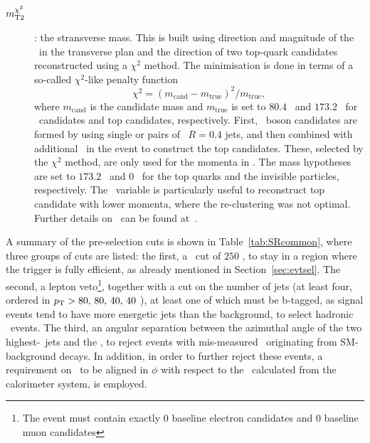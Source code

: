 \begin{description}
				\item[\boldmath $m_{\mathrm{T2}}^{\chi^2}$]: the stransverse mass. This is built using direction and magnitude of the \ptmiss\ in the transverse plan and the direction of two top-quark candidates reconstructed using a $\chi^2$ method. The minimisation is done in terms of a so-called $\chi^2$-like penalty function $$\chi^2 = \left(m_{\mathrm{cand}} - m_{\mathrm{true}}\right)^2 / m_{\mathrm{true}},$$ \noindent where $m_{\mathrm{cand}}$ is the candidate mass and $m_{\mathrm{true}}$ is set to $80.4$ \GeV\ and $173.2$ \GeV\ for \Wboson\ candidates and top candidates, respectively. First, \Wboson\ boson candidates are formed by using single or pairs of \antikt\ $R = 0.4$ jets, and then combined with additional \bjs\ in the event to construct the top candidates. These, selected by the $\chi^2$ method, are only used for the momenta in \mttwo. The mass hypotheses are set to $173.2$ \gev\ and $0$ \gev\ for the top quarks and the invisible particles, respectively.	The \mttwo\ variable is particularly useful to reconstruct top candidate with lower momenta, where the re-clustering was not optimal. Further details on \mttwo\ can be found at~\cite{Barr:2003rg, LESTER199999}.

			\end{description}

			A summary of the pre-selection cuts is shown in Table~\ref{tab:SRcommon}, where three groups of cuts are listed: the first, a \met\ cut of $250$ \GeV, to stay in a region where the trigger is fully efficient, as already mentioned in Section~\ref{sec:evtsel}. The second, a lepton veto\footnote{The event must contain exactly $0$ baseline electron candidates and $0$ baseline muon candidates}, together with a cut on the number of jets (at least four, ordered in $p_{\mathrm{T}} > 80,\,80,\,40,\,40$ \GeV), at least one of which must be b-tagged, as signal events tend to have more energetic jets than the background, to select hadronic \ttbar\ events. The third, an angular separation between the azimuthal angle of the two highest-\pt\ jets and the \ptmiss, to reject events with mis-measured \met\ originating from \ac{SM}-background decays. In addition, in order to further reject these events, a requirement on \ptmisstrk\ to be aligned in $\phi$ with respect to the \ptmiss\ calculated from the calorimeter system, is employed. 

